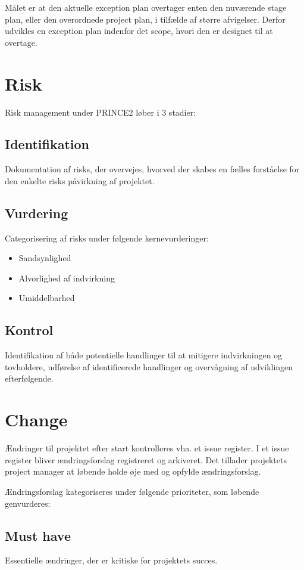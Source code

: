 Målet er at den aktuelle exception plan overtager enten den nuværende stage plan, eller den overordnede project plan, i tilfælde af større afvigelser. Derfor udvikles en exception plan indenfor det scope, hvori den er designet til at overtage.

\section{Risk}
Risk management under PRINCE2 løber i 3 stadier:

\subsection{Identifikation}
Dokumentation af risks, der overvejes, hvorved der skabes en fælles forståelse for den enkelte risks påvirkning af projektet.

\subsection{Vurdering}
Categorisering af risks under følgende kernevurderinger:
\begin{itemize}
    \item Sandsynlighed
    \item Alvorlighed af indvirkning
    \item Umiddelbarhed
\end{itemize}

\subsection{Kontrol}
Identifikation af både potentielle handlinger til at mitigere indvirkningen og tovholdere, udførelse af identificerede handlinger og overvågning af udviklingen efterfølgende.

\section{Change}
Ændringer til projektet efter start kontrolleres vha. et issue register. I et issue register bliver ændringsforslag registreret og arkiveret. Det tillader projektets project manager at løbende holde øje med og opfylde ændringsforslag.

Ændringsforslag kategoriseres under følgende prioriteter, som løbende genvurderes:

\subsection{Must have}
Essentielle ændringer, der er kritiske for projektets succes.

